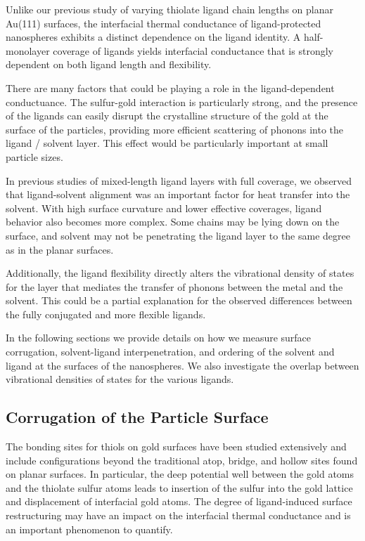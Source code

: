 \documentclass[aps,jcp,preprint,showpacs,superscriptaddress,groupedaddress]{revtex4-1}  %
\begin{document}
Unlike our previous study of varying thiolate ligand chain lengths on
planar Au(111) surfaces, the interfacial thermal conductance of
ligand-protected nanospheres exhibits a distinct dependence on the
ligand identity. A half-monolayer coverage of ligands yields
interfacial conductance that is strongly dependent on both ligand
length and flexibility.

There are many factors that could be playing a role in the
ligand-dependent conductuance.  The sulfur-gold interaction is
particularly strong, and the presence of the ligands can easily
disrupt the crystalline structure of the gold at the surface of the
particles, providing more efficient scattering of phonons into the
ligand / solvent layer. This effect would be particularly important at
small particle sizes.

In previous studies of mixed-length ligand layers with full coverage,
we observed that ligand-solvent alignment was an important factor for
heat transfer into the solvent.  With high surface curvature and lower
effective coverages, ligand behavior also becomes more complex. Some
chains may be lying down on the surface, and solvent may not be
penetrating the ligand layer to the same degree as in the planar
surfaces.  

Additionally, the ligand flexibility directly alters the vibrational
density of states for the layer that mediates the transfer of phonons
between the metal and the solvent. This could be a partial explanation
for the observed differences between the fully conjugated and more
flexible ligands.

In the following sections we provide details on how we
measure surface corrugation, solvent-ligand interpenetration, and
ordering of the solvent and ligand at the surfaces of the
nanospheres.  We also investigate the overlap between vibrational
densities of states for the various ligands.

\subsection{Corrugation of the Particle Surface}

The bonding sites for thiols on gold surfaces have been studied
extensively and include configurations beyond the traditional atop,
bridge, and hollow sites found on planar surfaces. In particular, the
deep potential well between the gold atoms and the thiolate sulfur
atoms leads to insertion of the sulfur into the gold lattice and
displacement of interfacial gold atoms. The degree of ligand-induced
surface restructuring may have an impact on the interfacial thermal
conductance and is an important phenomenon to quantify.
\end{document}
